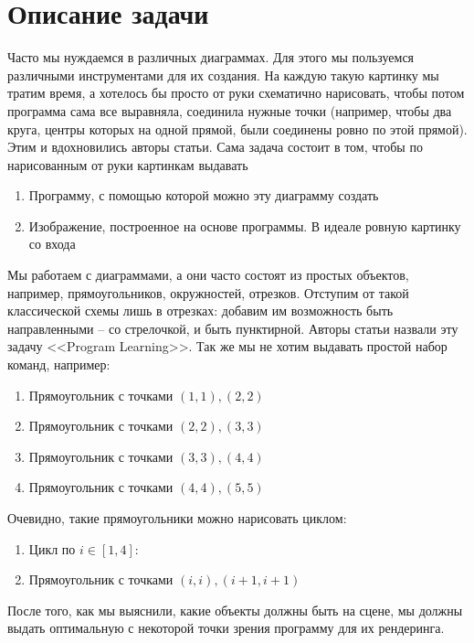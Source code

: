 \documentclass{article}
\begin{document}
\section{Описание задачи}
Часто мы нуждаемся в различных диаграммах. Для этого мы пользуемся различными инструментами для их создания. На каждую такую картинку мы тратим время, а хотелось бы просто от руки схематично нарисовать, чтобы потом программа сама все выравняла, соединила нужные точки (например, чтобы два круга, центры которых на одной прямой, были соединены ровно по этой прямой). Этим и вдохновились авторы статьи. Сама задача состоит в том, чтобы по нарисованным от руки картинкам выдавать
\begin{enumerate}
    \item Программу, с помощью которой можно эту диаграмму создать
    \item Изображение, построенное на основе программы. В идеале ровную картинку со входа
\end{enumerate}
Мы работаем с диаграммами, а они часто состоят из простых объектов, например, прямоугольников, окружностей, отрезков. Отступим от такой классической схемы лишь в отрезках: добавим им возможность быть направленными -- со стрелочкой, и быть пунктирной. Авторы статьи назвали эту задачу <<Program Learning>>. Так же мы не хотим выдавать простой набор команд, например:
\begin{enumerate}
    \item Прямоугольник с точками $(1, 1), (2, 2)$
    \item Прямоугольник с точками $(2, 2), (3, 3)$
    \item Прямоугольник с точками $(3, 3), (4, 4)$
    \item Прямоугольник с точками $(4, 4), (5, 5)$
\end{enumerate}
Очевидно, такие прямоугольники можно нарисовать циклом:
\begin{enumerate}
    \item[] Цикл по $i \in [1, 4]$:
    \item[] \qquad Прямоугольник с точками $(i, i), (i + 1, i + 1)$
\end{enumerate}
После того, как мы выяснили, какие объекты должны быть на сцене, мы должны выдать оптимальную с некоторой точки зрения программу для их рендеринга.
\end{document}

